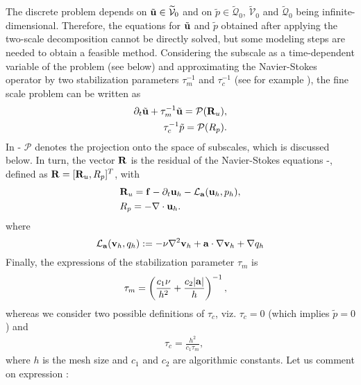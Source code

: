 The discrete problem depends on $\tilde{{\bf u}} \in \widetilde{\mathcal{V}}_0$ and on $\tilde{p}\in \widetilde{\mathcal{Q}}_0$,  $\widetilde{\mathcal{V}}_0$ and $\widetilde{\mathcal{Q}}_0$ being infinite-dimensional. Therefore, the equations for $\tilde{{\bf u}}$ and $\tilde{p}$ obtained after applying the two-scale decomposition cannot be directly solved, but some modeling steps are needed to obtain a feasible method. Considering the subscale as a time-dependent variable of the problem (see below) and approximating the Navier-Stokes operator by two stabilization parameters $\tau_m^{-1}$ and $\tau_c^{-1}$ (see for example \cite{codina_time_2007}), the fine scale problem can be written as
\begin{align}
\label{eq-velo_sgs}
\partial_t\tilde{{\bf u}}+\tau_m^{-1}\tilde{{\bf u}}=\mathcal{P}({\bf R}_u),\\
\label{eq-press_sgs}
\tau_c^{-1}\tilde{p}=\mathcal{P}(R_p).
\end{align}
In - $\mathcal{P}$ denotes the projection onto the space of subscales, which is discussed below. In turn, the vector ${\bf R}$ is the residual of the Navier-Stokes equations -, defined as ${\bf R}=[{\bf R}_u,R_p]^T$, with
\begin{align}
\label{eq-Ru}
&{\bf R}_u={\bf f}-\partial_t{\bf u}_h-\mathcal{L}_{{\bf a}}({\bf u}_h,p_h),\\
\label{eq-Rp}
&R_p=-\nabla\cdot{\bf u}_h.
\end{align}
where
\begin{equation}
\label{eq-operator}
\mathcal{L}_{{\bf a}}({\bf v}_h,q_h):=-\nu\nabla^2{\bf v}_h+{\bf a}\cdot\nabla{\bf v}_h+\nabla q_h
\end{equation}
Finally, the expressions of the stabilization parameter $\tau_m$ is 
\begin{align}
\label{eq-tau_m}
&\tau_m=\left(\frac{c_1\nu}{h^2}+\frac{c_2|{\bf a}|}{h}\right)^{-1},
\end{align}
whereas we consider two possible definitions of $\tau_c$, viz. $\tau_c = 0$ (which implies $\tilde{p} = 0$) and 
\begin{align}
\label{eq-tau_c}
&\tau_c=\frac{h^2}{c_1\tau_m},
\end{align}
where $h$ is the mesh size and $c_1$ and $c_2$ are algorithmic constants. Let us comment on expression :
